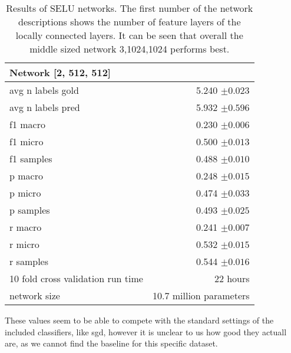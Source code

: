 \documentclass{article}
\begin{document}
\begin{table} [H]
  \begin{tabular}{l | r}
   \textbf{Network [2, 512, 512]} &  \\
   \hline
   \hline
   avg n labels gold & 5.240 $\pm 0.023$ \\
   \hline
   avg n labels pred & 5.932 $\pm 0.596$ \\
   \hline
   f1 macro & 0.230 $\pm 0.006$ \\
   \hline
   f1 micro & 0.500 $\pm 0.013$ \\
   \hline
   f1 samples & 0.488 $\pm 0.010$ \\
   \hline
   p macro & 0.248 $\pm 0.015 $ \\
   \hline
   p micro & 0.474 $\pm 0.033 $ \\
   \hline
   p samples & 0.493 $\pm 0.025$ \\
   \hline
   r macro & 0.241 $\pm 0.007$ \\
   \hline
   r micro & 0.532  $\pm  0.015$ \\
   \hline
   r samples & 0.544 $\pm 0.016 $ \\
   \hline
   10 fold cross validation run time & 22 hours \\
   \hline
   network size & 10.7 million parameters \\
  \end{tabular}
  
  \caption{Results of SELU networks. The first number of the network descriptions shows the number of feature layers of the locally connected layers. It can be seen that overall the 
  middle sized network 3,1024,1024 performs best.}
  \label{fig:selu_results}
\end{table}

These values seem to be able to compete with the standard settings of the included classifiers, like sgd, however it is unclear to us how good they actuall are, as we cannot find the baseline for
this specific dataset.
\end{document}
